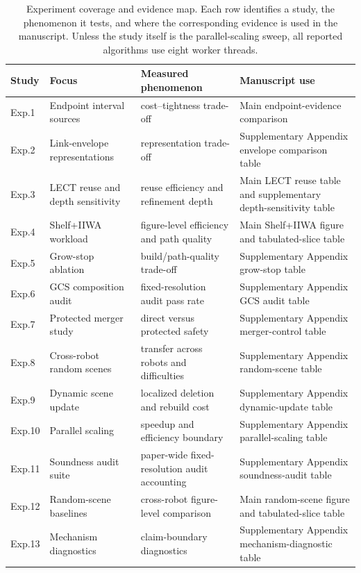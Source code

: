 \begin{table}[t]
\centering
\caption{Experiment coverage and evidence map. Each row identifies a study, the phenomenon it tests, and where the corresponding evidence is used in the manuscript. Unless the study itself is the parallel-scaling sweep, all reported algorithms use eight worker threads.}
\label{tab:tro_experiment_matrix}
\small
\setlength{\tabcolsep}{3.20pt}
\renewcommand{\arraystretch}{1.02}
\begin{tabular}{@{}p{}p{}p{}p{}@{}}
\toprule
Study & Focus & Measured phenomenon & Manuscript use \\
\midrule
Exp.1 & Endpoint interval sources & cost--tightness trade-off & Main endpoint-evidence comparison \\
Exp.2 & Link-envelope representations & representation trade-off & Supplementary Appendix envelope comparison table \\
Exp.3 & LECT reuse and depth sensitivity & reuse efficiency and refinement depth & Main LECT reuse table and supplementary depth-sensitivity table \\
Exp.4 & Shelf+IIWA workload & figure-level efficiency and path quality & Main Shelf+IIWA figure and tabulated-slice table \\
Exp.5 & Grow-stop ablation & build/path-quality trade-off & Supplementary Appendix grow-stop table \\
Exp.6 & GCS composition audit & fixed-resolution audit pass rate & Supplementary Appendix GCS audit table \\
Exp.7 & Protected merger study & direct versus protected safety & Supplementary Appendix merger-control table \\
Exp.8 & Cross-robot random scenes & transfer across robots and difficulties & Supplementary Appendix random-scene table \\
Exp.9 & Dynamic scene update & localized deletion and rebuild cost & Supplementary Appendix dynamic-update table \\
Exp.10 & Parallel scaling & speedup and efficiency boundary & Supplementary Appendix parallel-scaling table \\
Exp.11 & Soundness audit suite & paper-wide fixed-resolution audit accounting & Supplementary Appendix soundness-audit table \\
Exp.12 & Random-scene baselines & cross-robot figure-level comparison & Main random-scene figure and tabulated-slice table \\
Exp.13 & Mechanism diagnostics & claim-boundary diagnostics & Supplementary Appendix mechanism-diagnostic table \\
\bottomrule
\end{tabular}
\end{table}
